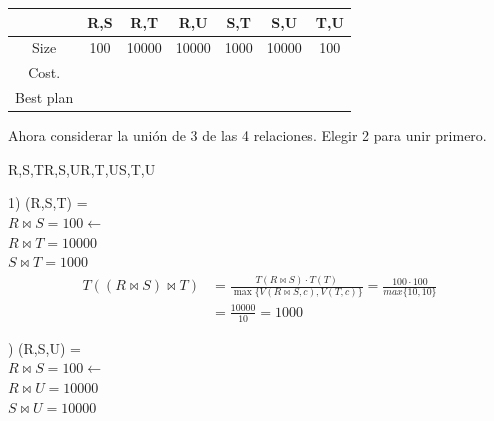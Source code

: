\documentclass{templateNote}
\begin{document}
\begin{enumerate}
\begin{enumerate}[label=\alph*)]
\begin{enumerate}[label=\alph*)]
                \begin{center}
                    \begin{tabular}{|c|c|c|c|c|c|c|}
                        \hline
                        & R,S & R,T & R,U & S,T & S,U & T,U\\
                        \hline
                        Size & 100 & 10000 & 10000 & 1000 & 10000 & 100 \\
                        \hline
                        Cost. & & & & & &  \\
                        \hline
                        Best plan & & & & & &  \\
                        \hline
                    \end{tabular}
                \end{center}
                
                \noindent Ahora considerar la unión de 3 de las 4 relaciones. Elegir 2 para unir primero.\\
                \begin{center}
                    {R,S,T}{R,S,U}{R,T,U}{S,T,U}
                \end{center}

                1) (R,S,T) = \\
                \hspace*{0.25cm}$R \Join S = 100  \leftarrow$ \\
                \hspace*{0.25cm}$R \Join T = 10000$ \\
                \hspace*{0.25cm}$S \Join T = 1000$ 
                \begin{align*}
                    T((R \Join S) \Join T) &= \frac{T(R \Join S)\cdot T(T)}{\max\{V(R \Join S,c),V(T,c)\}} = \frac{100\cdot100}{max\{10,10\}} \\ 
                    &= \frac{10000}{10} = 1000 
                \end{align*}
                
                ) (R,S,U) = \\
                \hspace*{0.25cm}$R \Join S = 100 \leftarrow$ \\
                \hspace*{0.25cm}$R \Join U = 10000$ \\
                \hspace*{0.25cm}$S \Join U = 10000$ \\


\end{enumerate}
\end{enumerate}
\end{enumerate}
\end{document}

